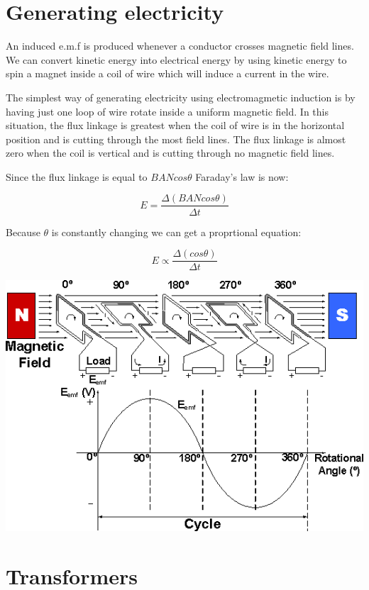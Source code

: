 \documentclass{article}
\begin{document}
\section*{Generating electricity}

An induced e.m.f is produced whenever a conductor crosses magnetic field lines.
We can convert kinetic energy into electrical energy by using kinetic energy to
spin a magnet inside a coil of wire which will induce a current in the wire.

The simplest way of generating electricity using electromagmetic induction is by
having just one loop of wire rotate inside a uniform magnetic field. In this
situation, the flux linkage is greatest when the coil of wire is in the
horizontal position and is cutting through the most field lines. The flux
linkage is almost zero when the coil is vertical and is cutting through no
magnetic field lines.

Since the flux linkage is equal to $BANcos\theta$ Faraday's law is now:

\[
	E = \frac{\Delta(BANcos\theta)}{\Delta t}
\]

Because $\theta$ is constantly changing we can get a proprtional equation:

\[
	E \propto \frac{\Delta(cos\theta)}{\Delta t}
\]

\begin{center}
	\includegraphics[scale=0.5]{rotating_coil_flux}
\end{center}

\section*{Transformers}
\end{document}
